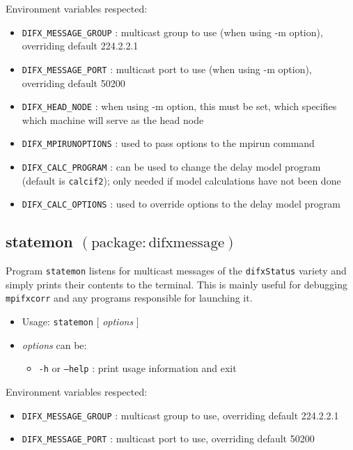 \noindent Environment variables respected:
\begin{itemize}
\item {\tt DIFX\_MESSAGE\_GROUP} : multicast group to use (when using -m option), overriding default 224.2.2.1
\item {\tt DIFX\_MESSAGE\_PORT} : multicast port to use (when using -m option), overriding default 50200
\item {\tt DIFX\_HEAD\_NODE} : when using -m option, this must be set, which specifies which machine will serve as the head node
\item {\tt DIFX\_MPIRUNOPTIONS} : used to pass options to the mpirun command
\item {\tt DIFX\_CALC\_PROGRAM} : can be used to change the delay model program (default is {\tt calcif2}); only needed if model calculations have not been done
\item {\tt DIFX\_CALC\_OPTIONS} : used to override options to the delay model program
\end{itemize}








\subsection{statemon {\small $\mathrm{(package: difxmessage)}$}} \label{sec:statemon} 

Program {\tt statemon} listens for multicast messages of the {\tt difxStatus} variety and simply prints their contents to the terminal.
This is mainly useful for debugging {\tt mpifxcorr} and any programs responsible for launching it.

\begin{itemize}
\item[] Usage: {\tt statemon} $[$ {\em options} $]$ 
\item[] {\em options} can be:
\begin{itemize}
\item[] {\tt -h} or {\tt --help} : print usage information and exit
\end{itemize}
\end{itemize}

\noindent Environment variables respected:
\begin{itemize}
\item {\tt DIFX\_MESSAGE\_GROUP} : multicast group to use, overriding default 224.2.2.1
\item {\tt DIFX\_MESSAGE\_PORT} : multicast port to use, overriding default 50200
\end{itemize}









